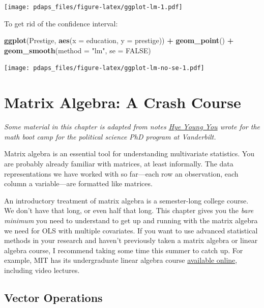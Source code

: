 \documentclass[12pt,oneside,openany]{book}
\newenvironment{Shaded}{\begin{snugshade}}{\end{snugshade}}
\newcommand{\KeywordTok}[1]{\textcolor[rgb]{0.13,0.29,0.53}{\textbf{#1}}}
\newcommand{\DataTypeTok}[1]{\textcolor[rgb]{0.13,0.29,0.53}{#1}}
\newcommand{\StringTok}[1]{\textcolor[rgb]{0.31,0.60,0.02}{#1}}
\newcommand{\OtherTok}[1]{\textcolor[rgb]{0.56,0.35,0.01}{#1}}
\newcommand{\OperatorTok}[1]{\textcolor[rgb]{0.81,0.36,0.00}{\textbf{#1}}}
\newcommand{\NormalTok}[1]{#1}
\begin{document}
\texttt{[image: pdaps\_files/figure-latex/ggplot-lm-1.pdf]}

To get rid of the confidence interval:

\begin{Shaded}
\begin{Highlighting}[]
\KeywordTok{ggplot}\NormalTok{(Prestige, }\KeywordTok{aes}\NormalTok{(}\DataTypeTok{x =}\NormalTok{ education, }\DataTypeTok{y =}\NormalTok{ prestige)) }\OperatorTok{+}
\StringTok{  }\KeywordTok{geom_point}\NormalTok{() }\OperatorTok{+}
\StringTok{  }\KeywordTok{geom_smooth}\NormalTok{(}\DataTypeTok{method =} \StringTok{"lm"}\NormalTok{, }\DataTypeTok{se =} \OtherTok{FALSE}\NormalTok{)}
\end{Highlighting}
\end{Shaded}

\texttt{[image: pdaps\_files/figure-latex/ggplot-lm-no-se-1.pdf]}

\chapter{Matrix Algebra: A Crash Course}\label{matrix}

\emph{Some material in this chapter is adapted from notes
\href{https://hyeyoungyou.com}{Hye Young You} wrote for the math boot
camp for the political science PhD program at Vanderbilt.}

Matrix algebra is an essential tool for understanding multivariate
statistics. You are probably already familiar with matrices, at least
informally. The data representations we have worked with so far---each
row an observation, each column a variable---are formatted like
matrices.

An introductory treatment of matrix algebra is a semester-long college
course. We don't have that long, or even half that long. This chapter
gives you the \emph{bare minimum} you need to understand to get up and
running with the matrix algebra we need for OLS with multiple
covariates. If you want to use advanced statistical methods in your
research and haven't previously taken a matrix algebra or linear algebra
course, I recommend taking some time this summer to catch up. For
example, MIT has its undergraduate linear algebra course
\href{https://ocw.mit.edu/courses/mathematics/18-06-linear-algebra-spring-2010/index.htm}{available
online}, including video lectures.

\section{Vector Operations}\label{vector-operations}
\end{document}
